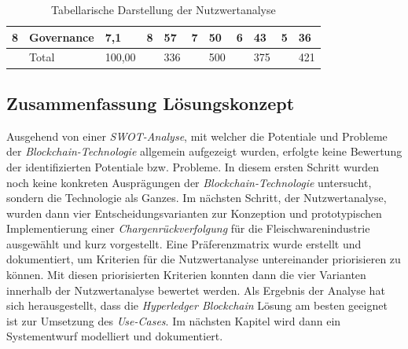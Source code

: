 \begin{landscape}
\begin{table}[H]
\begin{tabular}{@{}lllllllllll@{}}
	8         & Governance               & 7,1        & 8            & 57            & 7                 & 50                 & 6          & 43          & 5           & 36           \\
	\midrule
			  & Total                    & 100,00     &              & 336           &                   & 500                &            & 375         &             & 421          \\
	\bottomrule
	\end{tabular}
	\caption{Tabellarische Darstellung der Nutzwertanalyse}
	\label{tab:nutzwertanalyse}
	\end{table}
\end{landscape}

\subsection{Zusammenfassung Lösungskonzept}
Ausgehend von einer \textit{SWOT-Analyse}, mit welcher die Potentiale und Probleme der \textit{Blockchain-Technologie} allgemein aufgezeigt wurden, erfolgte keine Bewertung der identifizierten Potentiale bzw. Probleme. In diesem ersten Schritt wurden noch keine konkreten Ausprägungen der \textit{Blockchain-Technologie} untersucht, sondern die Technologie als Ganzes. Im nächsten Schritt, der Nutzwertanalyse, wurden dann vier Entscheidungsvarianten zur Konzeption und prototypischen Implementierung einer \textit{Chargenrückverfolgung} für die Fleischwarenindustrie ausgewählt und kurz vorgestellt. Eine Präferenzmatrix wurde erstellt und dokumentiert, um Kriterien für die Nutzwertanalyse untereinander priorisieren zu können. Mit diesen priorisierten Kriterien konnten dann die vier Varianten innerhalb der Nutzwertanalyse bewertet werden. Als Ergebnis der Analyse hat sich herausgestellt, dass die \textit{Hyperledger Blockchain} Lösung am besten geeignet ist zur Umsetzung des \textit{Use-Cases}. Im nächsten Kapitel wird dann ein Systementwurf modelliert und dokumentiert.

\newpage
